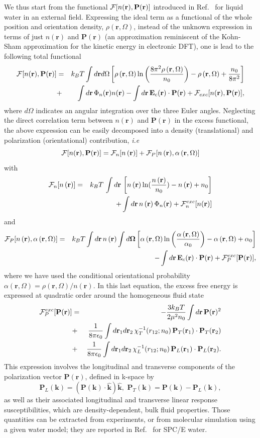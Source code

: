 \documentclass[aip,jcp,preprint]{revtex4-1}
\newcommand{\be}{\begin{equation}}
\newcommand{\ee}{\end{equation}}
\newcommand{\bea}{\begin{eqnarray}}
\newcommand{\eea}{\end{eqnarray}}
\newcommand{\nn}{\nonumber}
\newcommand{\RR}{\mathbf{r}}
\newcommand{\rr}{\mathbf{r}}
\newcommand{\dr}{d\mathbf{r}}
\newcommand{\kk}{\mathbf{k}}
\newcommand{\rhon}{{n\left({\mathbf r}\right)}}
\newcommand{\rhorom}{{\rho\left({\mathbf r},\Omega\right)}}
\newcommand{\alpharom}{{\alpha\left({\mathbf r},\Omega\right)}}
\newcommand{\Om}{\mathbf{\Omega}}
\newcommand{\nr}{n(\mathbf{r})}
\newcommand{\F}{{\cal F}}
\newcommand{\Pol}{\mathbf{P}({\mathbf r})}
\newcommand{\PP}{\mathbf{P}}
\newcommand{\EE}{\mathbf{E}}
\begin{document}
We thus start from the functional  $\F[n(\rr),\Pol]$ introduced in Ref.~ for liquid water in an external field.  Expressing the ideal term as a functional of the whole position and orientation density, $\rho(\rr,\Omega)$, instead of the unknown expression in terms of just $n(\rr)$ and  $\PP(\rr)$ (an approximation reminiscent of the Kohn-Sham approximation for the kinetic energy in electronic DFT),  one is lead to the following total functional 
\bea
\label{eq:Ftot}
\F[n(\rr),\PP(\rr)] &=& k_BT \int d\rr d\Omega \left[ \rhorom \ln \left(\frac{8\pi^2 \rhorom}{n_0} \right) - \rhorom+\frac{n_0}{8\pi^2} \right] \nn \\
& + &   \int \dr \, \Phi_n(\rr) n(\rr) - \int \dr \, \EE_c(\rr) \cdot \PP(\rr) + \F_{exc}[n(\rr),\PP(\rr)],
\eea
where $d\Omega$ indicates an angular integration over the three Euler angles. Neglecting the direct correlation term between $\nr$ and $\Pol$ in the excess functional, the above expression can be easily decomposed into a density (translational) and polarization (orientational) contribution, {\em i.e}
\be
  \F[n(\rr),\PP(\rr)] = \F_n[\rhon] + \F_P[\rhon,\alpharom]
  \label{eq:Fn+FP}
\ee
with
\bea
\F_n[\rhon] &= &k_BT \,\int d\RR \,  \left[ \rhon \ln(\frac{\rhon}{n_0})-\rhon+n_0 \right]  \nn \\
& & + \int d\rr\, \rhon \,  \Phi_n(\rr) + \F_n^{exc}[n(\rr)]   \label{eq:Fn}
\eea
and
\bea
\F_P[\rhon,\alpharom] &=& k_BT \int d\rr  \, \rhon \int d\Om \left[ \alpharom \ln \left(\frac{\alpharom}{\alpha_0} \right)  - \alpharom + \alpha_0 \right] \nn \\
& &  - \int \dr \, \EE_c(\rr) \cdot \PP(\rr) + \F_P^{exc}[\Pol], 
\label{eq:FP}
\eea
where we have used  the conditional orientational probability $\alpharom = \rhorom/\rhon$. In this last equation, the excess free energy is expressed at quadratic order around the homogeneous fluid state
\bea
\F_P^{exc}[\Pol] &= & -  \frac{3k_BT}{2\mu^2 n_0}  \int d\rr \, \Pol^2\nn \\
&+&      \frac{1}{8\pi \epsilon_0} \int d\rr_1 d\rr_2 \, \chi_T^{-1}(r_{12};n_0) \, \PP_T(\rr_1) \cdot \PP_T(\rr_2)  \nn \\
&+&    \frac{1}{8\pi \epsilon_0} \int d\rr_1 d\rr_2 \, \chi_L^{-1}(r_{12};n_0) \, \PP_L(\rr_1) \cdot \PP_L(\rr_2).  
\label{eq:FP_exc}
\eea
This expression involves the longitudinal and transverse components of the polarization vector $\Pol$, defined in k-space by
\be
\PP_L(\kk) = (\PP(\kk) \cdot \hat{\kk})  \hat{\kk}, \,  \, \PP_T(\kk) = \PP(\kk) - \PP_L(\kk),
\label{eq:P_L_T}
\ee
as well as their associated longitudinal and transverse linear response susceptibilities, which are density-dependent, bulk fluid properties. Those quantities can be extracted from experiments, or from molecular simulation using a given water model; they are reported in 
Ref.~ for SPC/E water.
\end{document}
